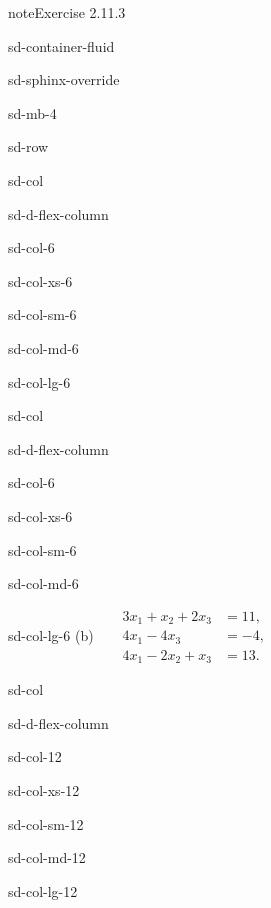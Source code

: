 \documentclass[letterpaper,10pt,english]{jupyterBook}
\begin{document}
\begin{sphinxadmonition}{note}{Exercise 2.11.3}
\begin{sphinxuseclass}{sd-container-fluid}
\begin{sphinxuseclass}{sd-sphinx-override}
\begin{sphinxuseclass}{sd-mb-4}
\begin{sphinxuseclass}{sd-row}
\begin{sphinxuseclass}{sd-col}
\begin{sphinxuseclass}{sd-d-flex-column}
\begin{sphinxuseclass}{sd-col-6}
\begin{sphinxuseclass}{sd-col-xs-6}
\begin{sphinxuseclass}{sd-col-sm-6}
\begin{sphinxuseclass}{sd-col-md-6}
\begin{sphinxuseclass}{sd-col-lg-6}
\end{sphinxuseclass}
\end{sphinxuseclass}
\end{sphinxuseclass}
\end{sphinxuseclass}
\end{sphinxuseclass}
\end{sphinxuseclass}
\end{sphinxuseclass}
\begin{sphinxuseclass}{sd-col}
\begin{sphinxuseclass}{sd-d-flex-column}
\begin{sphinxuseclass}{sd-col-6}
\begin{sphinxuseclass}{sd-col-xs-6}
\begin{sphinxuseclass}{sd-col-sm-6}
\begin{sphinxuseclass}{sd-col-md-6}
\begin{sphinxuseclass}{sd-col-lg-6}
\sphinxAtStartPar
(b)  
\( \begin{align*}
     3 x_{1} +  x_{2} + 2 x_{3} &= 11, \\
     4 x_{1} - 4 x_{3} &= -4, \\
     4 x_{1} - 2 x_{2} +  x_{3} &= 13.
\end{align*} \)

\end{sphinxuseclass}
\end{sphinxuseclass}
\end{sphinxuseclass}
\end{sphinxuseclass}
\end{sphinxuseclass}
\end{sphinxuseclass}
\end{sphinxuseclass}
\begin{sphinxuseclass}{sd-col}
\begin{sphinxuseclass}{sd-d-flex-column}
\begin{sphinxuseclass}{sd-col-12}
\begin{sphinxuseclass}{sd-col-xs-12}
\begin{sphinxuseclass}{sd-col-sm-12}
\begin{sphinxuseclass}{sd-col-md-12}
\begin{sphinxuseclass}{sd-col-lg-12}
\sphinxAtStartPar
 


\end{sphinxuseclass}
\end{sphinxuseclass}
\end{sphinxuseclass}
\end{sphinxuseclass}
\end{sphinxuseclass}
\end{sphinxuseclass}
\end{sphinxuseclass}
\end{sphinxuseclass}
\end{sphinxuseclass}
\end{sphinxuseclass}
\end{sphinxuseclass}
\end{sphinxadmonition}
\end{document}
